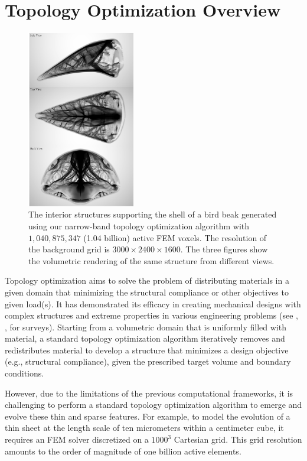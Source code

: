 \section{Topology Optimization Overview}
\begin{figure}
\centering
\includegraphics[width=0.42\textwidth]{images/TopOpt/beak_teaser}
\caption{The interior structures supporting the shell of a bird beak generated using our narrow-band topology optimization algorithm with $1,040,875,347$ (1.04 billion) active FEM voxels. The resolution of the background grid is $3000 \times 2400 \times 1600$. The three figures show the volumetric rendering of the same structure from different views.}
\label{fig:beak}
\end{figure}
Topology optimization aims to solve the problem of distributing materials in a given domain that minimizing the structural compliance or other objectives to given load(s).
It has demonstrated its efficacy in creating mechanical designs with complex structures and extreme properties in various engineering problems (see \cite{rozvany2009critical}, \cite{sigmund2013topology}, \cite{deaton2014survey} for surveys).
Starting from a volumetric domain that is uniformly filled with material, a standard topology optimization algorithm iteratively removes and redistributes material to develop a structure that minimizes a design objective (e.g., structural compliance), given the prescribed target volume and boundary conditions.  

However, due to the limitations of the previous computational frameworks, it is challenging to perform a standard topology optimization algorithm to emerge and evolve these thin and sparse features.
For example, to model the evolution of a thin sheet at the length scale of ten micrometers within a centimeter cube, it requires an FEM solver discretized on a $1000^3$ Cartesian grid. 
This grid resolution amounts to the order of magnitude of one billion active elements.

